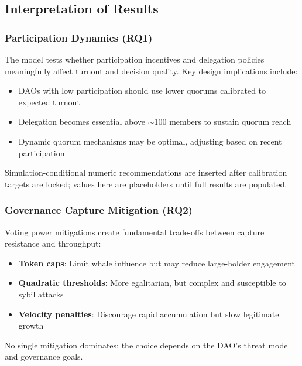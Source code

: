 
\subsection{Interpretation of Results}

\subsubsection{Participation Dynamics (RQ1)}

The model tests whether participation incentives and delegation policies meaningfully affect turnout and decision quality. Key design implications include:

\begin{itemize}
    \item DAOs with low participation should use lower quorums calibrated to expected turnout
    \item Delegation becomes essential above $\sim$100 members to sustain quorum reach
    \item Dynamic quorum mechanisms may be optimal, adjusting based on recent participation
\end{itemize}

Simulation-conditional numeric recommendations are inserted after calibration targets are locked; values here are placeholders until full results are populated.

\subsubsection{Governance Capture Mitigation (RQ2)}

Voting power mitigations create fundamental trade-offs between capture resistance and throughput:

\begin{itemize}
    \item \textbf{Token caps}: Limit whale influence but may reduce large-holder engagement
    \item \textbf{Quadratic thresholds}: More egalitarian, but complex and susceptible to sybil attacks
    \item \textbf{Velocity penalties}: Discourage rapid accumulation but slow legitimate growth
\end{itemize}

No single mitigation dominates; the choice depends on the DAO's threat model and governance goals.

